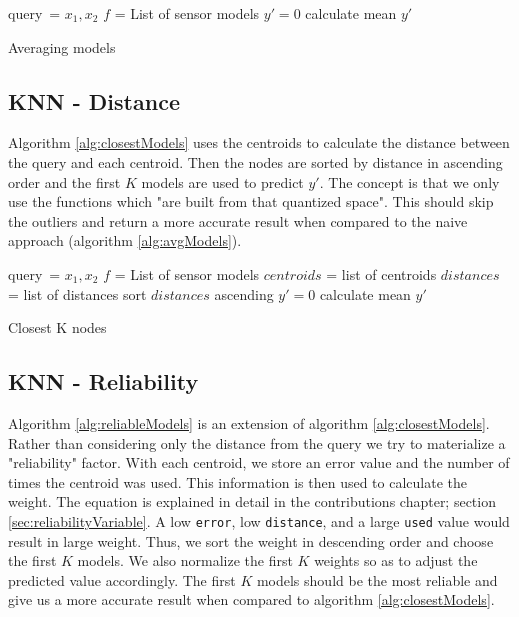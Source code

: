 \documentclass{mproj}
\begin{document}
\begin{algorithm}[H]
 query\ = $x_1,x_2$\; 
 $f$ = List of sensor models\;
 $y'=0$\;
 calculate mean $y'$
 \caption{Averaging models}
 \label{alg:avgModels}
\end{algorithm}

\subsection{KNN - Distance}
Algorithm \ref{alg:closestModels} uses the centroids to calculate the distance between the query and each centroid. Then the nodes are sorted by distance in ascending order and the first $K$ models are used to predict $y'$. The concept is that we only use the functions which "are built from that quantized space". This should skip the outliers and return a more accurate result when compared to the naive approach (algorithm \ref{alg:avgModels}).

\begin{algorithm}[H]
 query\ = $x_1,x_2$\;
 $f$ = List of sensor models\;
 $centroids$ = list of centroids\;
 $distances$ = list of distances\;
 sort $distances$ ascending\;
 $y'=0$\;
 calculate mean $y'$\;
 \caption{Closest K nodes}
 \label{alg:closestModels}
\end{algorithm}

\subsection{KNN - Reliability}
Algorithm \ref{alg:reliableModels} is an extension of algorithm \ref{alg:closestModels}. Rather than considering only the distance from the query we try to materialize a "reliability" factor. With each centroid, we store an error value and the number of times the centroid was used. This information is then used to calculate the weight. The equation is explained in detail in the contributions chapter; section \ref{sec:reliabilityVariable}. A low \texttt{error}, low \texttt{distance}, and a large \texttt{used} value would  result in large weight. Thus, we sort the weight in descending order and choose the first $K$ models. We also normalize the first $K$ weights so as to adjust the predicted value accordingly. The first $K$ models should be the most reliable and give us a more accurate result when compared to algorithm \ref{alg:closestModels}.
\end{document}

